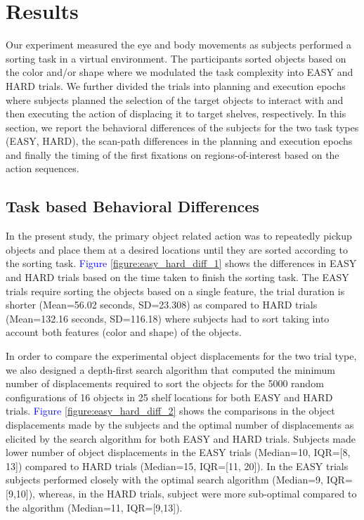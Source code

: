 \section{Results}

Our experiment measured the eye and body movements as subjects performed a sorting task in a virtual environment. The participants sorted objects based on the color and/or shape where we modulated the task complexity into EASY and HARD trials. We further divided the trials into planning and execution epochs where subjects  planned the selection of the target objects to interact with and then executing the action of displacing it to target shelves, respectively. In this section, we report the behavioral differences of the subjects for the two task types (EASY, HARD), the scan-path differences in the planning and execution epochs and finally the timing of the first fixations on regions-of-interest based on the action sequences.

\subsection{Task based Behavioral Differences}
In the present study, the primary object related action was to repeatedly pickup objects and place them at a desired locations until they are sorted according to the sorting task. \textcolor{Blue}{Figure \ref{figure:easy_hard_diff_1}} shows the differences in EASY and HARD trials based on the time taken to finish the sorting task. The EASY trials require sorting the objects based on a single feature, the trial duration is shorter (Mean=56.02 seconds, SD=23.308) as compared to HARD trials (Mean=132.16 seconds, SD=116.18) where subjects had to sort taking into account both features (color and shape) of the objects. 

In order to compare the experimental object displacements for the two trial type, we also designed a depth-first search algorithm that computed the minimum number of displacements required to sort the objects for the 5000 random configurations of 16 objects in 25 shelf locations for both EASY and HARD trials. \textcolor{Blue}{Figure \ref{figure:easy_hard_diff_2}} shows the comparisons in the object displacements made by the subjects and the optimal number of displacements as elicited by the search algorithm for both EASY and HARD trials. Subjects made lower number of object displacements in the EASY trials (Median=10, IQR=[8, 13]) compared to HARD trials (Median=15, IQR=[11, 20]). In the EASY trials subjects performed closely with the optimal search algorithm (Median=9, IQR=[9,10]), whereas, in the HARD trials, subject were more sub-optimal compared to the algorithm (Median=11, IQR=[9,13]).

